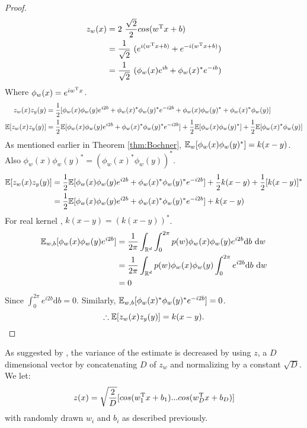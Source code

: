 \documentclass[english]{article}
\begin{document}
\begin{proof}
	\begin{equation*}
	\begin{split}
		z_w(x) &= 2 ~ \frac{\sqrt{2}}{2}cos(w^{\text{T}}x + b) \\
		&= \frac{1}{\sqrt{2}}~(e^{i(w^{\text{T}}x+b)} + e^{-i(w^{\text{T}}x+b)}) \\
		&= \frac{1}{\sqrt{2}}~(\phi_w(x)e^{ib} + \phi_w(x)^* e^{-ib})
	\end{split}
	\end{equation*}
	Where $\phi_w(x) = e^{iw^{\text{T}}x}$.
	\begin{equation*}
	\begin{split}
	z_w(x)z_y(y) &= \frac{1}{2}[\phi_w(x)\phi_w(y)e^{i2b} + \phi_w(x)^*\phi_w(y)^*e^{-i2b}
	 + \phi_w(x)\phi_w(y)^* + \phi_w(x)^*\phi_w(y)] \\
	\mathbb{E}[z_w(x)z_y(y)] &= \frac{1}{2}\mathbb{E}[\phi_w(x)\phi_w(y)e^{i2b} + \phi_w(x)^*\phi_w(y)^*e^{-i2b}]
	+ \frac{1}{2}\mathbb{E}[\phi_w(x)\phi_w(y)^*] + \frac{1}{2}\mathbb{E}[\phi_w(x)^*\phi_w(y)] \\ 
	\end{split}
	\end{equation*}
	As mentioned earlier in Theorem \ref{thm:Bochner}, $\mathbb{E}_w[\phi_w(x)\phi_w(y)^*] = k(x - y)$.
	Also $\phi_w(x)\phi_w(y)^* = (\phi_w(x)^*\phi_w(y))^*$.
	\begin{equation*}
	\begin{split}
	\mathbb{E}[z_w(x)z_y(y)] &= \frac{1}{2}\mathbb{E}[\phi_w(x)\phi_w(y)e^{i2b} + \phi_w(x)^*\phi_w(y)^*e^{-i2b}]
	+ \frac{1}{2}k(x-y) + \frac{1}{2}[k(x-y)]^* \\
	&= \frac{1}{2}\mathbb{E}[\phi_w(x)\phi_w(y)e^{i2b} + \phi_w(x)^*\phi_w(y)^*e^{-i2b}] + k(x-y)
	\end{split}
	\end{equation*}
	For real kernel , $k(x - y) = (k(x - y))^*$.
	\begin{equation*}
	\begin{split}
	\mathbb{E}_{w,b}[\phi_w(x)\phi_w(y)e^{i2b}] &= \frac{1}{2\pi}\int_{\mathbb{R}^d}\int_{0}^{2\pi} p(w)\phi_w(x)\phi_w(y)e^{i2b} \text{d}b~\text{d}w \\
	&= \frac{1}{2\pi}\int_{\mathbb{R}^d} p(w)\phi_w(x)\phi_w(y) \int_{0}^{2\pi} e^{i2b} \text{d}b~\text{d}w \\
	&= 0
	\end{split}
	\end{equation*}
	Since $\int_{0}^{2\pi} e^{i2b} \text{d}b = 0$. Similarly, $	\mathbb{E}_{w,b}[\phi_w(x)^*\phi_w(y)^*e^{-i2b}] = 0$.
	\[ \therefore \mathbb{E}[z_w(x)z_y(y)] = k(x - y). \]
	
\end{proof}
As suggested by \cite{RFF_Rahimi}, the variance of the estimate is decreased by using $z$, a $D$ dimensional vector by concatenating $D$ of $z_w$ and normalizing by a constant $\sqrt{D}$. We let:
\[z(x) = \sqrt{\frac{2}{D}} [cos(w_1^{\text{T}}x + b_1) ... cos(w_D^{\text{T}}x + b_D)] \]
with randomly drawn $w_i$ and $b_i$ as described previously.
\end{document}
